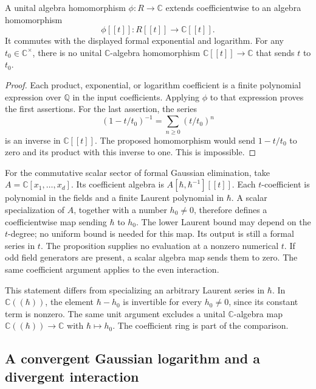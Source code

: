 \begin{proposition}
\label{prop:da-specialization}
A unital algebra homomorphism $\phi:R\to\mathbb C$ extends coefficientwise
to an algebra homomorphism
\[
 \phi[[t]]:R[[t]]\longrightarrow\mathbb C[[t]].
\]
It commutes with the displayed formal exponential and logarithm.
For any $t_0\in\mathbb C^\times$, there is no unital
$\mathbb C$-algebra homomorphism $\mathbb C[[t]]\to\mathbb C$
that sends $t$ to $t_0$.
\end{proposition}
\begin{proof}
Each product, exponential, or logarithm coefficient is a finite
polynomial expression over $\mathbb Q$ in the input coefficients.
Applying $\phi$ to that expression proves the first assertions.
For the last assertion, the series
\[
 (1-t/t_0)^{-1}=\sum_{n\geq0}(t/t_0)^n
\]
is an inverse in $\mathbb C[[t]]$. The proposed homomorphism would
send $1-t/t_0$ to zero and its product with this inverse to one.
This is impossible.
\end{proof}

For the commutative scalar sector of formal Gaussian elimination, take
$A=\mathbb C[x_1,\ldots,x_d]$. Its coefficient algebra is
$A[\hbar,\hbar^{-1}][[t]]$. Each $t$-coefficient is polynomial in the
fields and a finite Laurent polynomial in $\hbar$. A scalar
specialization of $A$, together with a number $h_0\ne0$, therefore
defines a coefficientwise map sending $\hbar$ to $h_0$.
The lower Laurent bound may depend on the $t$-degree; no uniform bound
is needed for this map. Its output is still a formal series in $t$.
The proposition supplies no evaluation at a nonzero numerical $t$.
If odd field generators are present, a scalar algebra map sends them
to zero. The same coefficient argument applies to the even interaction.

This statement differs from specializing an arbitrary Laurent series
in $\hbar$. In $\mathbb C((\hbar))$, the element $\hbar-h_0$ is
invertible for every $h_0\ne0$, since its constant term is nonzero.
The same unit argument excludes a unital $\mathbb C$-algebra map
$\mathbb C((\hbar))\to\mathbb C$ with $\hbar\mapsto h_0$.
The coefficient ring is part of the comparison.

\subsection{A convergent Gaussian logarithm and a divergent interaction}
\label{sec:da-gaussian}

